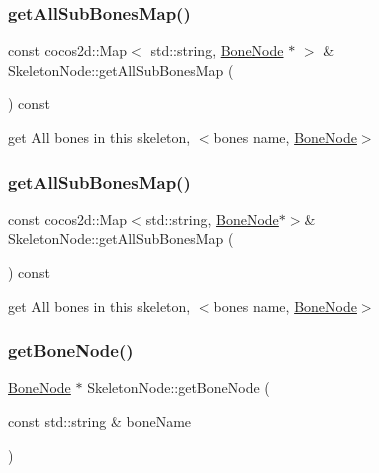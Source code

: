\subsubsection{\texorpdfstring{get\+All\+Sub\+Bones\+Map()}{getAllSubBonesMap()}\hspace{0.1cm}{\footnotesize\ttfamily [1/2]}}
{\footnotesize\ttfamily const cocos2d\+::\+Map$<$ std\+::string, \hyperlink{classBoneNode}{Bone\+Node} $\ast$ $>$ \& Skeleton\+Node\+::get\+All\+Sub\+Bones\+Map (\begin{DoxyParamCaption}{ }\end{DoxyParamCaption}) const}

get All bones in this skeleton, $<$bone\textquotesingle{}s name, \hyperlink{classBoneNode}{Bone\+Node}$>$ \mbox{\label{classSkeletonNode_a68cea338754560eb3bb53e0120ab357f}} 
\subsubsection{\texorpdfstring{get\+All\+Sub\+Bones\+Map()}{getAllSubBonesMap()}\hspace{0.1cm}{\footnotesize\ttfamily [2/2]}}
{\footnotesize\ttfamily const cocos2d\+::\+Map$<$std\+::string, \hyperlink{classBoneNode}{Bone\+Node}$\ast$$>$\& Skeleton\+Node\+::get\+All\+Sub\+Bones\+Map (\begin{DoxyParamCaption}{ }\end{DoxyParamCaption}) const}

get All bones in this skeleton, $<$bone\textquotesingle{}s name, \hyperlink{classBoneNode}{Bone\+Node}$>$ \mbox{\label{classSkeletonNode_a96e22a99becb19c489d99dd3957e06a4}} 
\subsubsection{\texorpdfstring{get\+Bone\+Node()}{getBoneNode()}\hspace{0.1cm}{\footnotesize\ttfamily [1/2]}}
{\footnotesize\ttfamily \hyperlink{classBoneNode}{Bone\+Node} $\ast$ Skeleton\+Node\+::get\+Bone\+Node (\begin{DoxyParamCaption}\item[{const std\+::string \&}]{bone\+Name }\end{DoxyParamCaption})}

